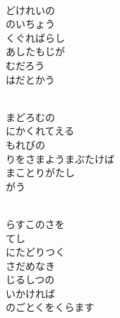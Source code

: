 \documentclass[10pt,b5j]{tarticle} %
\begin{document}
\vspace{1.5em} %
\newcommand{\linespace}{0.5em} %
\newcommand{\blocksize}{0.5\hsize} %
\newcommand{\itemmargin}{3em} %
\begin{enumerate} %
    \setlength{\itemindent}{\itemmargin} %
    \begin{minipage}[c]{\blocksize}
    
        \vspace{\linespace}
        \item~\\
        どけれいの\\
        のいちょう\\
        くぐればらし\\
        あしたもじが\\
        むだろう\\
        はだとかう
        
    \end{minipage}
    \begin{minipage}[c]{\blocksize}
        
        \vspace{\linespace}
        \item~\\
        まどろむの\\
        にかくれてえる\\
        もれびの\\
        りをさまようまぶたけば\\
        まことりがたし\\
        がう
        
    \end{minipage}
    \begin{minipage}[c]{\blocksize}
        
        \vspace{\linespace}
        \item~\\
        らすこのさを\\
        てし\\
        にたどりつく\\
        さだめなき\\
        じるしつの\\
        いかければ\\
        のごとくをくらます
        

\end{minipage}
\end{enumerate}
\end{document}
